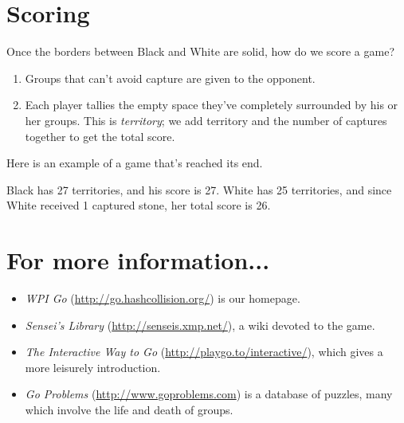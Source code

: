 \documentclass{article}
\begin{document}
\section*{Scoring}

Once the borders between Black and White are solid, how do we score a game?
\begin{enumerate}
\item Groups that can't avoid capture are given to the opponent.

\item Each player tallies the empty space they've completely surrounded
  by his or her groups.  This is \emph{territory}; we add territory
  and the number of captures together to get the total score.
\end{enumerate}
%
Here is an example of a game that's reached its end.
\begin{center}
\hspace{.3in}
\hspace{.3in}
\end{center}
Black has 27 territories, and his score is 27.  White has 25
territories, and since White received 1 captured stone, her total
score is 26.

\section*{For more information...}
\begin{itemize}
\item \emph{WPI Go} (\url{http://go.hashcollision.org/}) is our homepage.

\item \emph{Sensei's Library} (\url{http://senseis.xmp.net/}), a wiki
  devoted to the game.

\item \emph{The Interactive Way to Go}
  (\url{http://playgo.to/interactive/}), which gives a more leisurely
  introduction.

\item \emph{Go Problems}
 (\url{http://www.goproblems.com}) is a database of puzzles, many
  which involve the life and death of groups.

\end{itemize}
\end{document}

